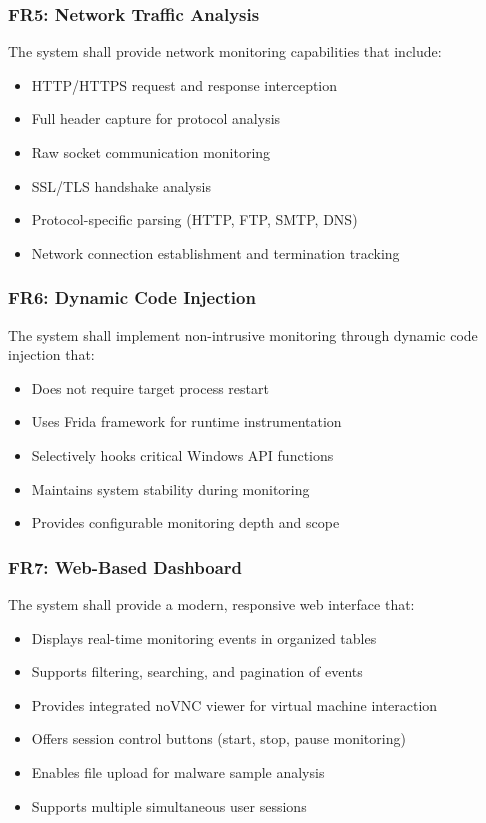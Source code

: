 \subsubsection{FR5: Network Traffic Analysis}

The system shall provide network monitoring capabilities that include:
\begin{itemize}
    \item HTTP/HTTPS request and response interception
    \item Full header capture for protocol analysis
    \item Raw socket communication monitoring
    \item SSL/TLS handshake analysis
    \item Protocol-specific parsing (HTTP, FTP, SMTP, DNS)
    \item Network connection establishment and termination tracking
\end{itemize}

\subsubsection{FR6: Dynamic Code Injection}

The system shall implement non-intrusive monitoring through dynamic code injection that:
\begin{itemize}
    \item Does not require target process restart
    \item Uses Frida framework for runtime instrumentation
    \item Selectively hooks critical Windows API functions
    \item Maintains system stability during monitoring
    \item Provides configurable monitoring depth and scope
\end{itemize}

\subsubsection{FR7: Web-Based Dashboard}

The system shall provide a modern, responsive web interface that:
\begin{itemize}
    \item Displays real-time monitoring events in organized tables
    \item Supports filtering, searching, and pagination of events
    \item Provides integrated noVNC viewer for virtual machine interaction
    \item Offers session control buttons (start, stop, pause monitoring)
    \item Enables file upload for malware sample analysis
    \item Supports multiple simultaneous user sessions
\end{itemize}

